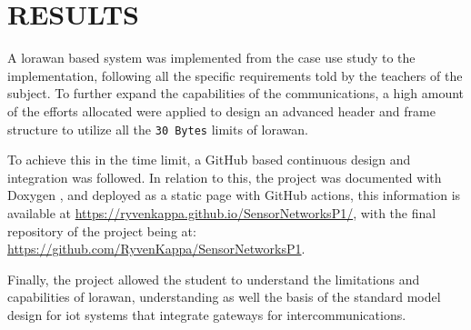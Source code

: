 \section{RESULTS}

A \acrshort{lorawan} based system was implemented from the case use study to the implementation, following all the specific requirements told by the teachers of the subject. 
To further expand the capabilities of the communications, a high amount of the efforts allocated were applied to design an advanced header and frame structure to utilize all the 
\texttt{30 Bytes} limits of \acrshort{lorawan}.

To achieve this in the time limit, a GitHub based continuous design and integration was followed. In relation to this, the project was documented with Doxygen , and deployed as a static page with GitHub actions, this information 
is available at \url{https://ryvenkappa.github.io/SensorNetworksP1/}, with the final repository of the project being at: \url{https://github.com/RyvenKappa/SensorNetworksP1}.

Finally, the project allowed the student to understand the limitations and capabilities of \acrshort{lorawan}, understanding as well the basis of the standard model design 
for \acrshort{iot} systems that integrate gateways for intercommunications.



